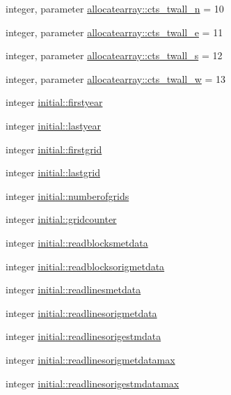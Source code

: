 \begin{DoxyCompactItemize}
integer, parameter \hyperlink{namespaceallocatearray_ad25c481cef6252cfd83ea4e9d509d1b7}{allocatearray\+::cts\+\_\+twall\+\_\+n} = 10
\item 
integer, parameter \hyperlink{namespaceallocatearray_ae2581683485a569595575e0e0edffd2e}{allocatearray\+::cts\+\_\+twall\+\_\+e} = 11
\item 
integer, parameter \hyperlink{namespaceallocatearray_afbc71d1cf394bfc96dc3c764f54430b8}{allocatearray\+::cts\+\_\+twall\+\_\+s} = 12
\item 
integer, parameter \hyperlink{namespaceallocatearray_a475efb928bb522ce93cf701e18cd74f9}{allocatearray\+::cts\+\_\+twall\+\_\+w} = 13
\item 
integer \hyperlink{namespaceinitial_abea65826f68b663575b9a8373cce36e6}{initial\+::firstyear}
\item 
integer \hyperlink{namespaceinitial_aacf5b4e12c32955da088ba130fe9588a}{initial\+::lastyear}
\item 
integer \hyperlink{namespaceinitial_aa3cbd56e6d33e03dc03b7b5fd49b98f6}{initial\+::firstgrid}
\item 
integer \hyperlink{namespaceinitial_a247bedafc3b9e5b5074be3df3c622439}{initial\+::lastgrid}
\item 
integer \hyperlink{namespaceinitial_a8b597530437378547375fd052f654b6d}{initial\+::numberofgrids}
\item 
integer \hyperlink{namespaceinitial_a285aa78da8f73cb954b61021b9761efc}{initial\+::gridcounter}
\item 
integer \hyperlink{namespaceinitial_a54d1c6370c32660f5e42047474ab1aa8}{initial\+::readblocksmetdata}
\item 
integer \hyperlink{namespaceinitial_aff81954b2154ea7014aad6d95ef548f9}{initial\+::readblocksorigmetdata}
\item 
integer \hyperlink{namespaceinitial_a15660cbc94e90ad74cdc75f0c1e9fb14}{initial\+::readlinesmetdata}
\item 
integer \hyperlink{namespaceinitial_ace32d965c8c765abd9b056bff91a8f87}{initial\+::readlinesorigmetdata}
\item 
integer \hyperlink{namespaceinitial_ad6e88b75e3208b4d643379dddca2a642}{initial\+::readlinesorigestmdata}
\item 
integer \hyperlink{namespaceinitial_ad101a761c07af352d00a800877772fd7}{initial\+::readlinesorigmetdatamax}
\item 
integer \hyperlink{namespaceinitial_acae158b3f7e930f70e6dd66bfc155993}{initial\+::readlinesorigestmdatamax}
\item 

\end{DoxyCompactItemize}
